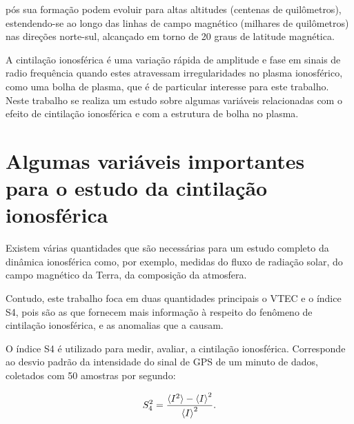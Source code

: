 pós sua formação podem evoluir para altas altitudes (centenas de quilômetros), estendendo-se ao longo das linhas de campo magnético (milhares de quilômetros) nas direções norte-sul, alcançado em torno de 20 graus de latitude magnética.


A cintilação ionosférica é uma variação rápida de amplitude e fase em sinais de radio frequência quando estes atravessam irregularidades no plasma ionosférico, como uma bolha de plasma, que é de particular interesse para este trabalho. Neste trabalho se realiza um estudo sobre algumas variáveis relacionadas com o efeito de cintilação ionosférica e com a estrutura de bolha no plasma.

\section{Algumas variáveis importantes para o estudo da cintilação ionosférica}

Existem várias quantidades que são necessárias para um estudo completo da dinâmica ionosférica como, por exemplo, medidas do fluxo de radiação solar, do campo magnético da Terra, da composição da atmosfera. 




Contudo, este trabalho foca em duas quantidades principais o VTEC e o índice S4, pois são as que fornecem mais informação à respeito do fenômeno de cintilação ionosférica, e as anomalias que a causam.


O índice S4 é utilizado para medir, avaliar, a cintilação ionosférica. Corresponde ao desvio padrão da intensidade do sinal de GPS de um minuto de dados, coletados com 50 amostras por segundo:

\begin{equation}
    S_4^2=\frac{\braket{I^2}-\braket{I}^2}{\braket{I}^2}\mbox{.}
\end{equation}

